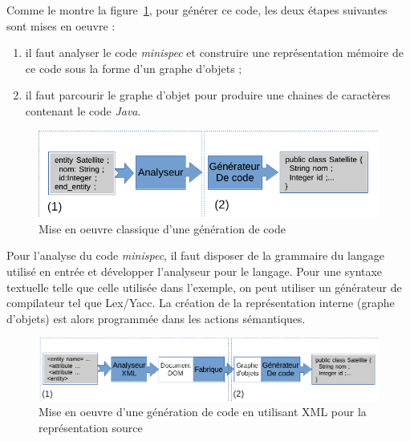 \documentclass[12pt]{article}
\begin{document}
Comme le montre la figure~\ref{fig:generation-code-1}, pour générer ce code, les deux étapes suivantes sont mises en oeuvre :
\begin{enumerate}
	\item il faut analyser le code \textit{minispec} et construire une représentation mémoire de ce code sous la forme d'un graphe d'objets ;
	\item il faut parcourir le graphe d'objet pour produire une chaines de caractères contenant le code \textit{Java}.
\end{enumerate}

\begin{figure}
\begin{center}
\includegraphics[scale=0.5]{generation-code-1.png}
\end{center}
\caption{Mise en oeuvre classique d'une génération de code}
\label{fig:generation-code-1}
\end{figure} 

Pour l'analyse du code \textit{minispec}, il faut disposer de la grammaire du langage utilisé en entrée et développer l'analyseur pour le langage. Pour une syntaxe textuelle telle que celle utilisée dans l'exemple, on peut utiliser un générateur de compilateur tel que Lex/Yacc. La création de la représentation interne (graphe d'objets) est alors programmée dans les actions sémantiques.

\begin{figure}
\begin{center}
\includegraphics[scale=0.5]{generation-code-2.png}
\end{center}
\caption{Mise en oeuvre d'une génération de code en utilisant XML pour la représentation source}
\label{fig:generation-code-2}
\end{figure} 
\end{document}
